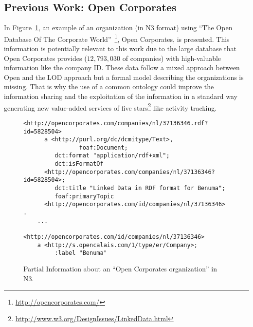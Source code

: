 \documentclass{llncs}
\begin{document}
\subsection{Previous Work: Open Corporates}\label{open-corporates}

In Figure~\ref{figure:open}, an example of an organization (in N3 format) using 
``The Open Database Of The Corporate World''~\footnote{\url{http://opencorporates.com/}}, Open Corporates, 
is presented. This information is potentially relevant to this work due to the large database 
that Open Corporates provides ($12,793,030$ of companies) with high-valuable information like the company ID. These data 
follow a mixed approach between Open and the LOD approach but a formal model describing the organizations is missing. 
That is why the use of a common ontology could improve the information sharing and the exploitation of 
the information in a standard way generating new value-added services of five stars\footnote{\url{ http://www.w3.org/DesignIssues/LinkedData.html}} like activity tracking. 

\begin{figure}[!h]
\begin{center}
\begin{lstlisting}[language=SPARQL]
    <http://opencorporates.com/companies/nl/37136346.rdf?id=5828504>    
      a <http://purl.org/dc/dcmitype/Text>,
                foaf:Document;
         dct:format "application/rdf+xml";
         dct:isFormatOf 
	  <http://opencorporates.com/companies/nl/37136346?id=5828504>;
         dct:title "Linked Data in RDF format for Benuma";
         foaf:primaryTopic 
	  <http://opencorporates.com/id/companies/nl/37136346> .
    ...
        <http://opencorporates.com/id/companies/nl/37136346>     
	a <http://s.opencalais.com/1/type/er/Company>;
         :label "Benuma" 
\end{lstlisting}
\caption{Partial Information about an ``Open Corporates organization'' in N3.}
\label{figure:open}
\end{center}
\end{figure}
\end{document}
